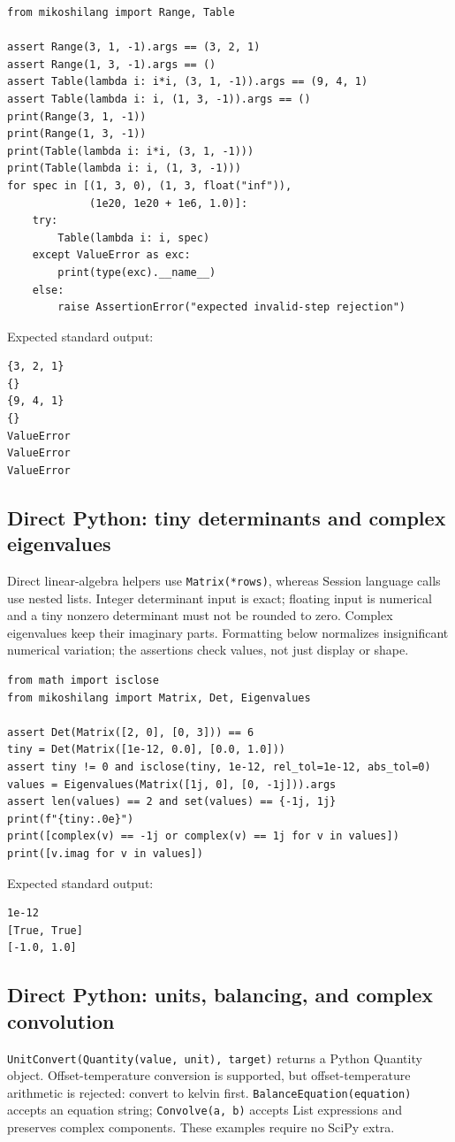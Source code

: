 \begin{lstlisting}[style=mikoshi]
from mikoshilang import Range, Table

assert Range(3, 1, -1).args == (3, 2, 1)
assert Range(1, 3, -1).args == ()
assert Table(lambda i: i*i, (3, 1, -1)).args == (9, 4, 1)
assert Table(lambda i: i, (1, 3, -1)).args == ()
print(Range(3, 1, -1))
print(Range(1, 3, -1))
print(Table(lambda i: i*i, (3, 1, -1)))
print(Table(lambda i: i, (1, 3, -1)))
for spec in [(1, 3, 0), (1, 3, float("inf")),
             (1e20, 1e20 + 1e6, 1.0)]:
    try:
        Table(lambda i: i, spec)
    except ValueError as exc:
        print(type(exc).__name__)
    else:
        raise AssertionError("expected invalid-step rejection")
\end{lstlisting}
\noindent Expected standard output:
\begin{lstlisting}[style=mikoshi]
{3, 2, 1}
{}
{9, 4, 1}
{}
ValueError
ValueError
ValueError
\end{lstlisting}

\subsection{Direct Python: tiny determinants and complex eigenvalues}
Direct linear-algebra helpers use \texttt{Matrix(*rows)}, whereas Session language calls use nested lists. Integer determinant input is exact; floating input is numerical and a tiny nonzero determinant must not be rounded to zero. Complex eigenvalues keep their imaginary parts. Formatting below normalizes insignificant numerical variation; the assertions check values, not just display or shape.

\begin{lstlisting}[style=mikoshi]
from math import isclose
from mikoshilang import Matrix, Det, Eigenvalues

assert Det(Matrix([2, 0], [0, 3])) == 6
tiny = Det(Matrix([1e-12, 0.0], [0.0, 1.0]))
assert tiny != 0 and isclose(tiny, 1e-12, rel_tol=1e-12, abs_tol=0)
values = Eigenvalues(Matrix([1j, 0], [0, -1j])).args
assert len(values) == 2 and set(values) == {-1j, 1j}
print(f"{tiny:.0e}")
print([complex(v) == -1j or complex(v) == 1j for v in values])
print([v.imag for v in values])
\end{lstlisting}
\noindent Expected standard output:
\begin{lstlisting}[style=mikoshi]
1e-12
[True, True]
[-1.0, 1.0]
\end{lstlisting}

\subsection{Direct Python: units, balancing, and complex convolution}
\texttt{UnitConvert(Quantity(value, unit), target)} returns a Python Quantity object. Offset-temperature conversion is supported, but offset-temperature arithmetic is rejected: convert to kelvin first. \texttt{BalanceEquation(equation)} accepts an equation string; \texttt{Convolve(a, b)} accepts List expressions and preserves complex components. These examples require no SciPy extra.

